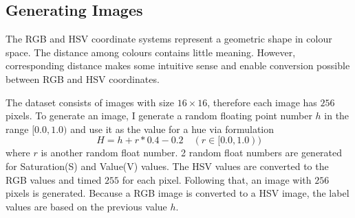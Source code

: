 \subsection{Generating Images}

The RGB and HSV coordinate systems represent a geometric shape in colour space. The distance among colours contains little meaning. However, corresponding distance makes some intuitive sense and enable conversion possible between RGB and HSV coordinates.

The dataset consists of images with size $16\times16$, therefore each image has $256$ pixels. To generate an image, I generate a random floating point number $h$ in the range $[0.0, 1.0)$ and use it as the value for a hue via formulation
\begin{equation}\label{eq:FormulationHue}
H = h + r * 0.4 - 0.2 \quad (r \in [0.0,1.0))
\end{equation}
where $r$ is another random float number. 2 random float numbers are generated for Saturation(S) and Value(V) values. The HSV values are converted to the RGB values and timed $255$ for each pixel. Following that, an image with $256$ pixels is generated. Because a RGB image is converted to a HSV image, the label values are based on the previous value $h$.

